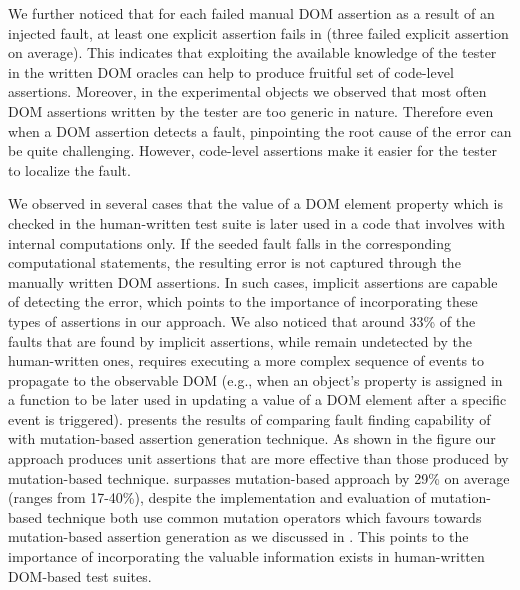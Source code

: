 We further noticed that for each failed manual DOM assertion as a result of an injected fault, at least one explicit assertion fails in \tool (three failed explicit assertion on average). This indicates that exploiting the available knowledge of the tester in the written DOM oracles can help to produce fruitful set of code-level assertions. Moreover, in the experimental objects we observed that most often DOM assertions written by the tester are too generic in nature. Therefore even when a DOM assertion detects a \javascript fault, pinpointing the root cause of the error can be quite challenging. However, code-level assertions make it easier for the tester to localize the fault.

We observed in several cases that the value of a DOM element property which is checked in the human-written test suite is later used in a \javascript code that involves with internal computations only. If the seeded fault falls in the corresponding computational statements, the resulting error is not captured through the manually written DOM assertions. In such cases, implicit assertions are capable of detecting the error, which points to the importance of incorporating these types of assertions in our approach. We also noticed that around 33\% of the faults that are found by implicit assertions, while remain undetected by the human-written ones, requires executing a more complex sequence of events to propagate to the observable DOM (e.g., when an object's property is assigned in a function to be later used in updating a value of a DOM element after a specific event is triggered).    
 presents the results of comparing fault finding capability of \tool with mutation-based assertion generation technique. As shown in the figure our approach produces unit assertions that are more effective than those produced by mutation-based technique. \tool surpasses mutation-based approach by 29\% on average (ranges from 17-40\%), despite the implementation and evaluation of mutation-based technique both use common mutation operators which favours towards mutation-based assertion generation as we discussed in . This points to the importance of incorporating the valuable information exists in human-written DOM-based test suites.


